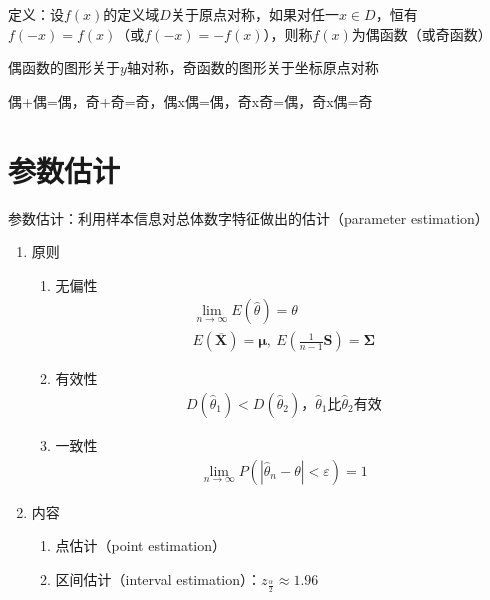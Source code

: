 \documentclass[12pt]{book}
\begin{document}
定义：设$f(x)$的定义域$D$关于原点对称，如果对任一$x\in D$，恒有$f(-x)=f(x)$（或$ f(-x)=- f(x)$），则称$f(x)$为偶函数（或奇函数）


偶函数的图形关于$y$轴对称，奇函数的图形关于坐标原点对称

偶+偶=偶，奇+奇=奇，偶x偶=偶，奇x奇=偶，奇x偶=奇







\chapter{参数估计}

参数估计：利用样本信息对总体数字特征做出的估计（parameter estimation）
\\

\begin{enumerate}[1.]
    \item 原则
          \begin{enumerate}[(1)]
              \item 无偏性
                    \begin{gather*}
                        \lim_{n→\infty}{E(\hat{\theta})=\theta } \\
                        E\left(\overline{\bm{X}}\right)=\bm{\mu},\ E\left(\frac{1}{n-1}\bm{S}\right)=\bm{\Sigma}
                    \end{gather*}
              \item 有效性
                    \begin{gather*}
                        D(\hat{\theta}_1)<D(\hat{\theta}_2)，\hat{\theta}_1比\hat{\theta}_2有效
                    \end{gather*}
              \item 一致性
                    \begin{gather*}
                        \lim_{n\rightarrow\infty}{P\left({\left|{\hat{\theta}}_n-\theta\right|<\varepsilon}\right)}=1
                    \end{gather*}
          \end{enumerate}
    \item 内容
          \begin{enumerate}[(1)]
              \item 点估计（point estimation）
              \item 区间估计（interval estimation）：$z_{\frac{\alpha}{2}}\approx 1.96$
                    \begin{enumerate}[a.]

\end{enumerate}
\end{enumerate}
\end{enumerate}
\end{document}
